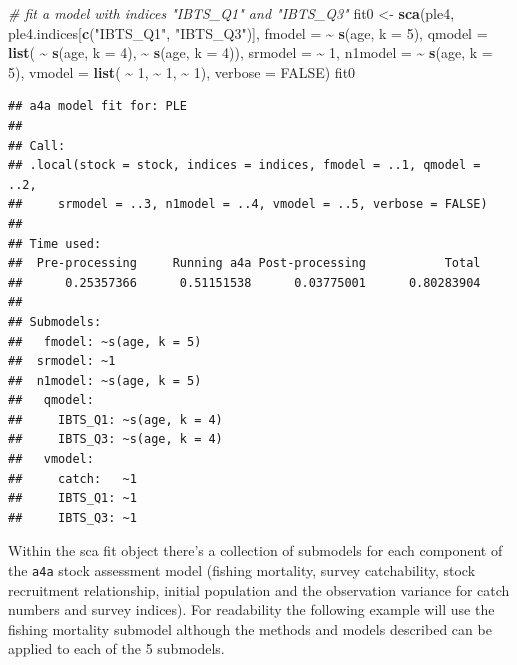 \documentclass[
]{book}
\newenvironment{Shaded}{\begin{snugshade}}{\end{snugshade}}
\newcommand{\AttributeTok}[1]{\textcolor[rgb]{0.13,0.29,0.53}{#1}}
\newcommand{\CommentTok}[1]{\textcolor[rgb]{0.56,0.35,0.01}{\textit{#1}}}
\newcommand{\ConstantTok}[1]{\textcolor[rgb]{0.56,0.35,0.01}{#1}}
\newcommand{\DecValTok}[1]{\textcolor[rgb]{0.00,0.00,0.81}{#1}}
\newcommand{\FunctionTok}[1]{\textcolor[rgb]{0.13,0.29,0.53}{\textbf{#1}}}
\newcommand{\NormalTok}[1]{#1}
\newcommand{\OtherTok}[1]{\textcolor[rgb]{0.56,0.35,0.01}{#1}}
\newcommand{\SpecialCharTok}[1]{\textcolor[rgb]{0.81,0.36,0.00}{\textbf{#1}}}
\newcommand{\StringTok}[1]{\textcolor[rgb]{0.31,0.60,0.02}{#1}}
\begin{document}
\begin{Shaded}
\begin{Highlighting}[]
 \CommentTok{\# fit a model with indices "IBTS\_Q1" and "IBTS\_Q3"}
\NormalTok{ fit0 }\OtherTok{\textless{}{-}} \FunctionTok{sca}\NormalTok{(ple4, ple4.indices[}\FunctionTok{c}\NormalTok{(}\StringTok{"IBTS\_Q1"}\NormalTok{, }\StringTok{"IBTS\_Q3"}\NormalTok{)],}
             \AttributeTok{fmodel =} \SpecialCharTok{\textasciitilde{}} \FunctionTok{s}\NormalTok{(age, }\AttributeTok{k =} \DecValTok{5}\NormalTok{),}
             \AttributeTok{qmodel =} \FunctionTok{list}\NormalTok{( }\SpecialCharTok{\textasciitilde{}} \FunctionTok{s}\NormalTok{(age, }\AttributeTok{k =} \DecValTok{4}\NormalTok{), }\SpecialCharTok{\textasciitilde{}} \FunctionTok{s}\NormalTok{(age, }\AttributeTok{k =} \DecValTok{4}\NormalTok{)),}
             \AttributeTok{srmodel =} \SpecialCharTok{\textasciitilde{}} \DecValTok{1}\NormalTok{,}
             \AttributeTok{n1model =} \SpecialCharTok{\textasciitilde{}} \FunctionTok{s}\NormalTok{(age, }\AttributeTok{k =} \DecValTok{5}\NormalTok{),}
             \AttributeTok{vmodel =} \FunctionTok{list}\NormalTok{( }\SpecialCharTok{\textasciitilde{}} \DecValTok{1}\NormalTok{, }\SpecialCharTok{\textasciitilde{}} \DecValTok{1}\NormalTok{, }\SpecialCharTok{\textasciitilde{}} \DecValTok{1}\NormalTok{),}
             \AttributeTok{verbose =} \ConstantTok{FALSE}\NormalTok{)}
\NormalTok{ fit0}
\end{Highlighting}
\end{Shaded}

\begin{verbatim}
## a4a model fit for: PLE 
## 
## Call:
## .local(stock = stock, indices = indices, fmodel = ..1, qmodel = ..2, 
##     srmodel = ..3, n1model = ..4, vmodel = ..5, verbose = FALSE)
## 
## Time used:
##  Pre-processing     Running a4a Post-processing           Total 
##      0.25357366      0.51151538      0.03775001      0.80283904 
## 
## Submodels:
##   fmodel: ~s(age, k = 5)
##  srmodel: ~1
##  n1model: ~s(age, k = 5)
##   qmodel:
##     IBTS_Q1: ~s(age, k = 4)
##     IBTS_Q3: ~s(age, k = 4)
##   vmodel:
##     catch:   ~1
##     IBTS_Q1: ~1
##     IBTS_Q3: ~1
\end{verbatim}

Within the sca fit object there's a collection of submodels for each component of the \texttt{a4a} stock assessment model (fishing mortality, survey catchability, stock recruitment relationship, initial population and the observation variance for catch numbers and survey indices). For readability the following example will use the fishing mortality submodel although the methods and models described can be applied to each of the 5 submodels.
\end{document}
